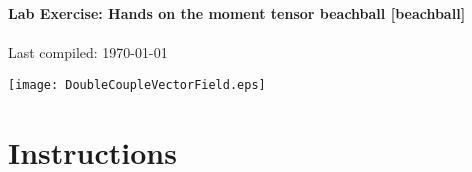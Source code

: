 \documentclass[11pt,titlepage,fleqn]{article}
\begin{document}

\begin{spacing}{1.2}
\centering
{\large \bf Lab Exercise: Hands on the moment tensor beachball [beachball]} \\
\cltag\ \\
Last compiled: \today \\
\end{spacing}


\vspace{-4.4cm}
\begin{center}
\texttt{[image: DoubleCoupleVectorField.eps]}
\end{center}


\vspace{-1.8cm}
\section*{Instructions}
\end{document}
